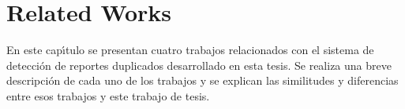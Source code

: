 \chapter{Related Works}
\label{relatedWorks}

En este cap\'{\i}tulo se presentan cuatro trabajos relacionados con el sistema de detecci\'{o}n de reportes duplicados desarrollado en esta tesis. Se realiza una breve descripci\'{o}n de cada uno de los trabajos y se explican las similitudes y diferencias entre esos trabajos y este trabajo de tesis.

\clearpage
